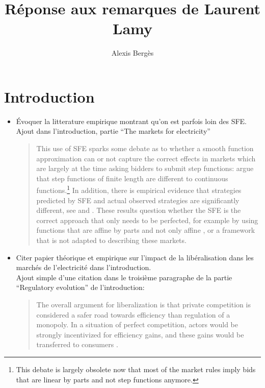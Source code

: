 \documentclass{article}
\begin{document}
\title{Réponse aux remarques de Laurent Lamy}
\author{Alexis Bergès}

\maketitle

\section{Introduction}
\begin{itemize}
\item Évoquer la litterature empirique montrant qu'on est parfois loin des SFE.\\

Ajout dans l'introduction, partie ``The markets for electricity''\\

\begin{quote}
This use of SFE sparks some debate as to whether a smooth function approximation can or not capture the correct effects in markets which are largely at the time asking bidders to submit step functions: \cite{von1993spot} argue that step functions of finite length are different to continuous functions.\footnote{This debate is largely obsolete now that most of the market rules imply bids that are linear by parts and not step functions anymore.} In addition, there is empirical evidence that strategies predicted by SFE and actual observed strategies are significantly different, see \cite{willems2009cournot} and \cite{willems2009cournot}. These results question whether the SFE is the correct approach that only needs to be perfected, for example by using functions that are affine by parts and not only affine \cite{baldick2004theory}, or a framework that is not adapted to describing these markets.
\end{quote}

\item Citer papier théorique et empirique sur l'impact de la libéralisation dans les marchés de l'electricité dans l'introduction.\\

Ajout simple d'une citation dans le troisième paragraphe de la partie ``Regulatory evolution'' de l'introduction:\\

\begin{quote}
The overall argument for liberalization is that private competition is considered a safer road towards efficiency than regulation of a monopoly. In a situation of perfect competition, actors would be strongly incentivized for efficiency gains, and these gains would be transferred to consumers \cite{schmidt1996costs}.
\end{quote}


\end{itemize}
\end{document}
